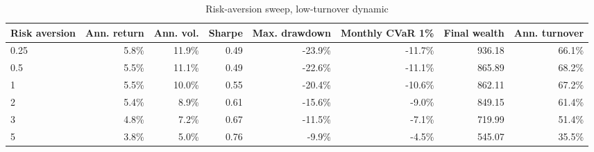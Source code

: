 \begin{table}[!htbp]
\centering
\caption{Risk-aversion sweep, low-turnover dynamic}
\label{tab:allocation-risk-aversion-low-turnover}
\small
\setlength{\tabcolsep}{5pt}
\renewcommand{\arraystretch}{1.12}
\begin{adjustbox}{center,max width=\linewidth}
\begin{tabular}{lrrrrrrr}
\toprule
Risk aversion & Ann. return & Ann. vol. & Sharpe & Max. drawdown & Monthly CVaR 1\% & Final wealth & Ann. turnover \\
\midrule
0.25 & 5.8\% & 11.9\% & 0.49 & -23.9\% & -11.7\% & 936.18 & 66.1\% \\
0.5 & 5.5\% & 11.1\% & 0.49 & -22.6\% & -11.1\% & 865.89 & 68.2\% \\
1 & 5.5\% & 10.0\% & 0.55 & -20.4\% & -10.6\% & 862.11 & 67.2\% \\
2 & 5.4\% & 8.9\% & 0.61 & -15.6\% & -9.0\% & 849.15 & 61.4\% \\
3 & 4.8\% & 7.2\% & 0.67 & -11.5\% & -7.1\% & 719.99 & 51.4\% \\
5 & 3.8\% & 5.0\% & 0.76 & -9.9\% & -4.5\% & 545.07 & 35.5\% \\
\bottomrule
\end{tabular}
\end{adjustbox}
\end{table}